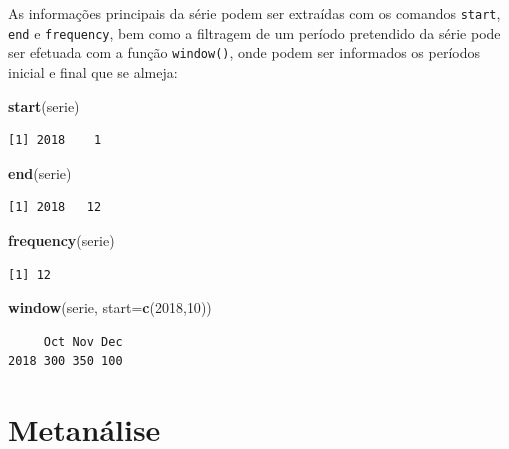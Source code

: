 \documentclass[12pt,brazil,oneside]{book}
\newenvironment{Shaded}{\begin{snugshade}}{\end{snugshade}}
\newcommand{\DataTypeTok}[1]{\textcolor[rgb]{0.13,0.29,0.53}{#1}}
\newcommand{\DecValTok}[1]{\textcolor[rgb]{0.00,0.00,0.81}{#1}}
\newcommand{\KeywordTok}[1]{\textcolor[rgb]{0.13,0.29,0.53}{\textbf{#1}}}
\newcommand{\NormalTok}[1]{#1}
\begin{document}
As informações principais da série podem ser extraídas com os comandos \texttt{start}, \texttt{end} e \texttt{frequency}, bem como a filtragem de um período pretendido da série pode ser efetuada com a função \texttt{window()}, onde podem ser informados os períodos inicial e final que se almeja:

\begin{Shaded}
\begin{Highlighting}[]
\KeywordTok{start}\NormalTok{(serie)}
\end{Highlighting}
\end{Shaded}

\begin{verbatim}
[1] 2018    1
\end{verbatim}

\begin{Shaded}
\begin{Highlighting}[]
\KeywordTok{end}\NormalTok{(serie)}
\end{Highlighting}
\end{Shaded}

\begin{verbatim}
[1] 2018   12
\end{verbatim}

\begin{Shaded}
\begin{Highlighting}[]
\KeywordTok{frequency}\NormalTok{(serie)}
\end{Highlighting}
\end{Shaded}

\begin{verbatim}
[1] 12
\end{verbatim}

\begin{Shaded}
\begin{Highlighting}[]
\KeywordTok{window}\NormalTok{(serie, }\DataTypeTok{start=}\KeywordTok{c}\NormalTok{(}\DecValTok{2018}\NormalTok{,}\DecValTok{10}\NormalTok{))}
\end{Highlighting}
\end{Shaded}

\begin{verbatim}
     Oct Nov Dec
2018 300 350 100
\end{verbatim}

\hypertarget{metanalise}{%
\chapter{Metanálise}\label{metanalise}}
\end{document}
